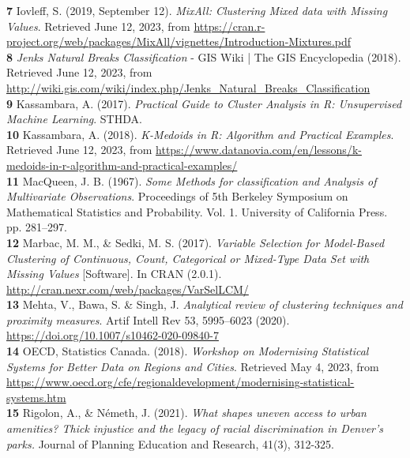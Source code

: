 \documentclass[11pt, a4paper]{article}
\begin{document}
\noindent\textbf{7} Iovleff, S. (2019, September 12). \textit{MixAll: Clustering Mixed data with Missing Values}. Retrieved June 12, 2023, from \sloppy\url{https://cran.r-project.org/web/packages/MixAll/vignettes/Introduction-Mixtures.pdf} \\

\noindent\textbf{8} \textit{Jenks Natural Breaks Classification} - GIS Wiki | The GIS Encyclopedia (2018). Retrieved June 12, 2023, from \sloppy\url{http://wiki.gis.com/wiki/index.php/Jenks_Natural_Breaks_Classification} \\

\noindent\textbf{9} Kassambara, A. (2017). \textit{Practical Guide to Cluster Analysis in R: Unsupervised Machine Learning}. STHDA. \\

\noindent\textbf{10} Kassambara, A. (2018). \textit{K-Medoids in R: Algorithm and Practical Examples}. Retrieved June 12, 2023, from \sloppy\url{https://www.datanovia.com/en/lessons/k-medoids-in-r-algorithm-and-practical-examples/} \\

\noindent\textbf{11} MacQueen, J. B. (1967). \textit{Some Methods for classification and Analysis of Multivariate Observations}. Proceedings of 5th Berkeley Symposium on Mathematical Statistics and Probability. Vol. 1. University of California Press. pp. 281–297. \\ 

\noindent\textbf{12} Marbac, M. M., \& Sedki, M. S. (2017). \textit{Variable Selection for Model-Based Clustering of Continuous, Count, Categorical or Mixed-Type Data Set with Missing Values} [Software]. In CRAN (2.0.1). \sloppy\url{ http://cran.nexr.com/web/packages/VarSelLCM/} \\

\noindent\textbf{13} Mehta, V., Bawa, S. \& Singh, J. \textit{Analytical review of clustering techniques and proximity measures}. Artif Intell Rev 53, 5995–6023 (2020). \sloppy\url{https://doi.org/10.1007/s10462-020-09840-7} \\

\noindent\textbf{14} OECD, Statistics Canada. (2018). \textit{Workshop on Modernising Statistical Systems for Better Data on Regions and Cities}.  Retrieved May 4, 2023, from \sloppy\url{https://www.oecd.org/cfe/regionaldevelopment/modernising-statistical-systems.htm} \\

\noindent\textbf{15} Rigolon, A., \& Németh, J. (2021). \textit{What shapes uneven access to urban amenities? Thick injustice and the legacy of racial discrimination in Denver’s parks.} Journal of Planning Education and Research, 41(3), 312-325. \\ 
\end{document}
